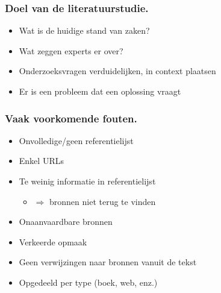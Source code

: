 \documentclass[aspectratio=169]{beamer}
\begin{document}
\begin{frame}
    \frametitle{Doel van de literatuurstudie.}

    \begin{itemize}
      \item Wat is de huidige stand van zaken?
      \item Wat zeggen experts er over?
      \item Onderzoeksvragen verduidelijken, in context plaatsen
      \item Er is een probleem dat een oplossing vraagt
    \end{itemize}

    \bigskip

  \end{frame}

\begin{frame}
  \frametitle{Vaak voorkomende fouten.}

  \begin{itemize}
    \item Onvolledige/geen referentielijst
    \item Enkel URLs
    \item Te weinig informatie in referentielijst
    \begin{itemize}
      \item \(\Rightarrow\) bronnen niet terug te vinden
    \end{itemize}
    \item Onaanvaardbare bronnen
    \item Verkeerde opmaak
    \item Geen verwijzingen naar bronnen vanuit de tekst
    \item Opgedeeld per type (boek, web, enz.)
  \end{itemize}
\end{frame}
\end{document}
